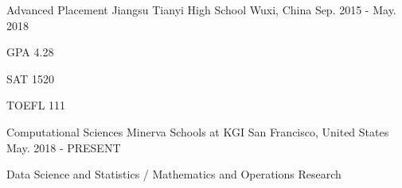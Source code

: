\begin{cventries}
  \cventry
    {Advanced Placement}
    {Jiangsu Tianyi High School}
    {Wuxi, China}
    {Sep. 2015 - May. 2018}
    {
      \begin{cvitems}
        \item {GPA 4.28}
        \item {SAT 1520}
        \item {TOEFL 111}
      \end{cvitems}
    }
  \cventry
    {Computational Sciences}
    {Minerva Schools at KGI}
    {San Francisco, United States}
    {May. 2018 - PRESENT}
    {
      \begin{cvitems}
        \item {Data Science and Statistics / Mathematics and Operations Research}
      \end{cvitems}
    }
\end{cventries}

